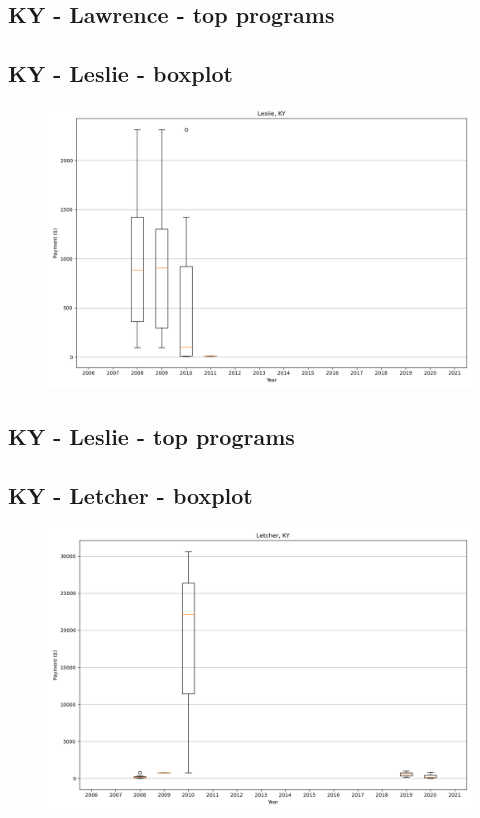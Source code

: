 \subsection*{KY - Lawrence - top programs}

\newpage
\subsection*{KY - Leslie - boxplot}
\begin{figure}[h]
\centering
\includegraphics[width=7in]{../output/boxplots/counties/Leslie-KY_boxplot.png}
\end{figure}


\subsection*{KY - Leslie - top programs}

\newpage
\subsection*{KY - Letcher - boxplot}
\begin{figure}[h]
\centering
\includegraphics[width=7in]{../output/boxplots/counties/Letcher-KY_boxplot.png}
\end{figure}


